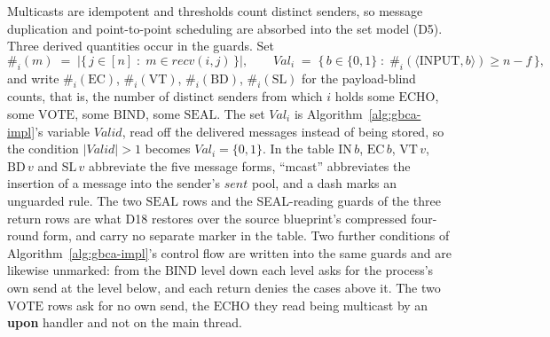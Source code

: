 Multicasts are idempotent and thresholds count distinct senders, so message
duplication and point-to-point scheduling are absorbed into the set model (D5).
Three derived quantities occur in the guards.
Set
\[
  \#_i(m) \;=\; |\{\, j \in [n] \;:\; m \in \mathit{recv}(i,j) \,\}|,
  \qquad
  \mathit{Val}_i \;=\;
    \{\, b \in \{0,1\} \;:\; \#_i(\langle\mathrm{INPUT}, b\rangle) \ge n - f \,\},
\]
and write $\#_i(\mathrm{EC})$, $\#_i(\mathrm{VT})$, $\#_i(\mathrm{BD})$,
$\#_i(\mathrm{SL})$ for the payload-blind counts, that is, the number of
distinct senders from which $i$ holds some $\mathrm{ECHO}$, some
$\mathrm{VOTE}$, some $\mathrm{BIND}$, some $\mathrm{SEAL}$.
The set $\mathit{Val}_i$ is Algorithm~\ref{alg:gbca-impl}'s variable
$\mathit{Valid}$, read off the delivered messages instead of being stored, so
the condition $|\mathit{Valid}| > 1$ becomes $\mathit{Val}_i = \{0,1\}$.
In the table $\mathrm{IN}\,b$, $\mathrm{EC}\,b$, $\mathrm{VT}\,v$,
$\mathrm{BD}\,v$ and $\mathrm{SL}\,v$ abbreviate the five message forms,
``mcast'' abbreviates the insertion of a message into the sender's
$\mathit{sent}$ pool, and a dash marks an unguarded rule.
The two $\mathrm{SEAL}$ rows and the SEAL-reading guards of the three return
rows are what D18 restores over the source blueprint's compressed four-round form, and carry
no separate marker in the table.
Two further conditions of Algorithm~\ref{alg:gbca-impl}'s control flow are written
into the same guards and are likewise unmarked: from the $\mathrm{BIND}$ level
down each level asks for the process's own send at the level below, and each
return denies the cases above it.
The two $\mathrm{VOTE}$ rows ask for no own send, the $\mathrm{ECHO}$ they read
being multicast by an \textbf{upon} handler and not on the main thread.

